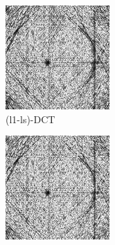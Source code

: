 \documentclass[journal]{IEEEtran}
\begin{document}
\begin{figure}[!h]
\begin{subfigure}[b]{0.24\linewidth}
        \includegraphics[width=\textwidth]{../images/potato/post_tci/comparison/weightsIm_cs_dct30.png}
        \caption{(l1-ls)-DCT}
     \end{subfigure}
    \begin{subfigure}[b]{0.24\linewidth}
        \includegraphics[width=\textwidth]{../images/potato/post_tci/comparison/weightsIm_cs_wavelet30.png}

\end{subfigure}
\end{figure}
\end{document}
